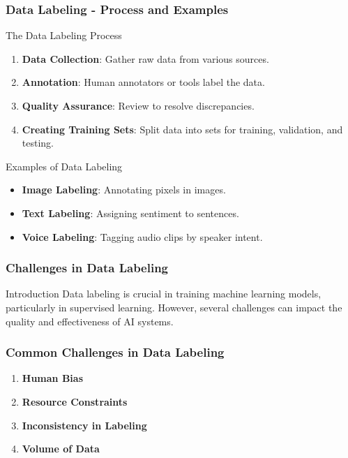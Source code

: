 \documentclass[aspectratio=169]{beamer}
\begin{document}
\begin{frame}[fragile]
    \frametitle{Data Labeling - Process and Examples}
    \begin{block}{The Data Labeling Process}
        \begin{enumerate}
            \item \textbf{Data Collection}: Gather raw data from various sources.
            \item \textbf{Annotation}: Human annotators or tools label the data.
            \item \textbf{Quality Assurance}: Review to resolve discrepancies.
            \item \textbf{Creating Training Sets}: Split data into sets for training, validation, and testing.
        \end{enumerate}
    \end{block}

    \begin{block}{Examples of Data Labeling}
        \begin{itemize}
            \item \textbf{Image Labeling}: Annotating pixels in images.
            \item \textbf{Text Labeling}: Assigning sentiment to sentences.
            \item \textbf{Voice Labeling}: Tagging audio clips by speaker intent.
        \end{itemize}
    \end{block}
\end{frame}

\begin{frame}[fragile]
    \frametitle{Challenges in Data Labeling}
    
    \begin{block}{Introduction}
        Data labeling is crucial in training machine learning models, particularly in supervised learning. However, several challenges can impact the quality and effectiveness of AI systems.
    \end{block}
\end{frame}

\begin{frame}[fragile]
    \frametitle{Common Challenges in Data Labeling}
    
    \begin{enumerate}
        \item \textbf{Human Bias}
        \item \textbf{Resource Constraints}
        \item \textbf{Inconsistency in Labeling}
        \item \textbf{Volume of Data}
    \end{enumerate}
\end{frame}
\end{document}
